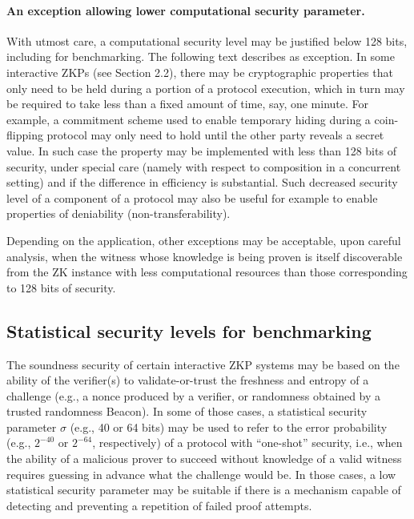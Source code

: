 \paragraph{An exception allowing lower computational security parameter.}
	With utmost care, a computational security level may be justified below 128 bits, including for benchmarking.
	The following text describes as exception.
	In some interactive ZKPs (see Section 2.2), there may be cryptographic properties that only need to be held during a portion of a protocol execution, which in turn may be required to take less than a fixed amount of time, say, one minute.
	For example, a commitment scheme used to enable temporary hiding during a coin-flipping protocol may only need to hold until the other party reveals a secret value.
	In such case the property may be implemented with less than 128 bits of security, under special care (namely with respect to composition in a concurrent setting) and if the difference in efficiency is substantial.
	Such decreased security level of a component of a protocol may also be useful for example to enable properties of deniability (non-transferability).

    Depending on the application, other exceptions may be acceptable, upon careful analysis, when the witness whose knowledge is being proven is itself discoverable from the ZK instance with less computational resources than those corresponding to 128 bits of security. 



\def\tmpTitle{Statistical security levels for benchmarking}
\subsection[\tmpTitle]{\tmpTitle{}}
\label{security:efficiency:stat-sec-levels}


	The soundness security of certain interactive ZKP systems may be based on the ability of the verifier(s) to validate-or-trust the freshness and entropy of a challenge (e.g., a nonce produced by a verifier, or randomness obtained by a trusted randomness Beacon).
	In some of those cases, a statistical security parameter $\sigma$ (e.g., 40 or 64 bits) may be used to refer to the error probability (e.g., $2^{-40}$ or $2^{-64}$, respectively) of a protocol with ``one-shot'' security, i.e., when the ability of a malicious prover to succeed without knowledge of a valid witness requires guessing in advance what the challenge would be.
	In those cases, a low statistical security parameter may be suitable if there is a mechanism capable of detecting and preventing a repetition of failed proof attempts.

